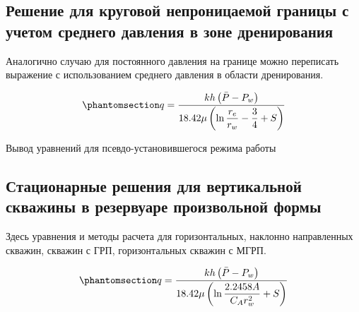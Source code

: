\documentclass[
  russian,
  letterpaper,
  DIV=11,
  numbers=noendperiod,
  oneside]{scrartcl}
\begin{document}
\subsection{Решение для круговой непроницаемой границы с учетом среднего
давления в зоне
дренирования}\label{ux440ux435ux448ux435ux43dux438ux435-ux434ux43bux44f-ux43aux440ux443ux433ux43eux432ux43eux439-ux43dux435ux43fux440ux43eux43dux438ux446ux430ux435ux43cux43eux439-ux433ux440ux430ux43dux438ux446ux44b-ux441-ux443ux447ux435ux442ux43eux43c-ux441ux440ux435ux434ux43dux435ux433ux43e-ux434ux430ux432ux43bux435ux43dux438ux44f-ux432-ux437ux43eux43dux435-ux434ux440ux435ux43dux438ux440ux43eux432ux430ux43dux438ux44f}

Аналогично случаю для постоянного давления на границе можно переписать
выражение с использованием среднего давления в области дренирования.

\begin{equation}\phantomsection\label{eq-dupui_pss_aver_press}{
q=\frac{kh\left( \bar{P}-P_w\right)}{ 18.42 \mu\left(\ln{\dfrac{r_e}{r_w}} - \dfrac{3}{4}+ S \right)}
}\end{equation}

Вывод уравнений для псевдо-установившегося режима работы

\subsection{Стационарные решения для вертикальной скважины в резервуаре
произвольной
формы}\label{ux441ux442ux430ux446ux438ux43eux43dux430ux440ux43dux44bux435-ux440ux435ux448ux435ux43dux438ux44f-ux434ux43bux44f-ux432ux435ux440ux442ux438ux43aux430ux43bux44cux43dux43eux439-ux441ux43aux432ux430ux436ux438ux43dux44b-ux432-ux440ux435ux437ux435ux440ux432ux443ux430ux440ux435-ux43fux440ux43eux438ux437ux432ux43eux43bux44cux43dux43eux439-ux444ux43eux440ux43cux44b}

Здесь уравнения и методы расчета для горизонтальных, наклонно
направленных скважин, скважин с ГРП, горизонтальных скважин с МГРП.

\begin{equation}\phantomsection\label{eq-dupui_pss_form_factor}{
    q=\frac{kh\left( \bar{P}-P_w\right)}{ 18.42 \mu\left(\ln{\dfrac{2.2458 A}{C_A r_w^2}} + S \right)}
}\end{equation}
\end{document}
